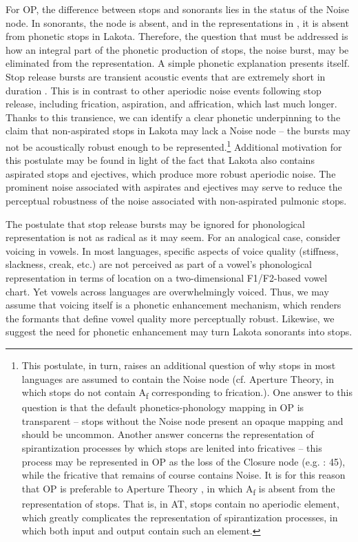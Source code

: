 \documentclass[output=paper]{langscibook}
\begin{document}
For OP, the difference between stops and sonorants lies in the status of the Noise node. In sonorants, the node is absent, and in the representations in , it is absent from phonetic stops in Lakota. Therefore, the question that must be addressed is how an integral part of the phonetic production of stops, the noise burst, may be eliminated from the representation. A simple phonetic explanation presents itself. Stop release bursts are transient acoustic events that are extremely short in duration \citep[348]{Stevens1998}. This is in contrast to other aperiodic noise events following stop release, including frication, aspiration, and affrication, which last much longer. Thanks to this transience, we can identify a clear phonetic underpinning to the claim that non-aspirated stops in Lakota may lack a Noise node – the bursts may not be acoustically robust enough to be represented.\footnote{This postulate, in turn, raises an additional question of why stops in most languages are assumed to contain the Noise node (cf. Aperture Theory, in which stops do not contain A\textsubscript{f}  corresponding to frication.). One answer to this question is that the default phonetics-phonology mapping in OP is transparent – stops without the Noise node present an opaque mapping and should be uncommon. Another answer concerns the representation of spirantization processes by which stops are lenited into fricatives – this process may be represented in OP as the loss of the Closure node (e.g. \citealt{Schwartz2016}: 45), while the fricative that remains of course contains Noise. It is for this reason that OP is preferable to Aperture Theory \citep{Steriade1993}, in which A\textsubscript{f} is absent from the representation of stops. That is, in AT, stops contain no aperiodic element, which greatly complicates the representation of spirantization processes, in which both input and output contain such an element.}  Additional motivation for this postulate may be found in light of the fact that Lakota also contains aspirated stops and ejectives, which produce more robust aperiodic noise. The prominent noise associated with aspirates and ejectives may serve to reduce the perceptual robustness of the noise associated with non-aspirated pulmonic stops.

The postulate that stop release bursts may be ignored for phonological representation is not as radical as it may seem. For an analogical case, consider voicing in vowels. In most languages, specific aspects of voice quality (stiffness, slackness, creak, etc.) are not perceived as part of a vowel’s phonological representation in terms of location on a two-dimensional F1/F2-based vowel chart. Yet vowels across languages are overwhelmingly voiced. Thus, we may assume that voicing itself is a phonetic enhancement mechanism, which renders the formants that define vowel quality more perceptually robust. Likewise, we suggest the need for phonetic enhancement may turn Lakota sonorants into stops. 
\end{document}

